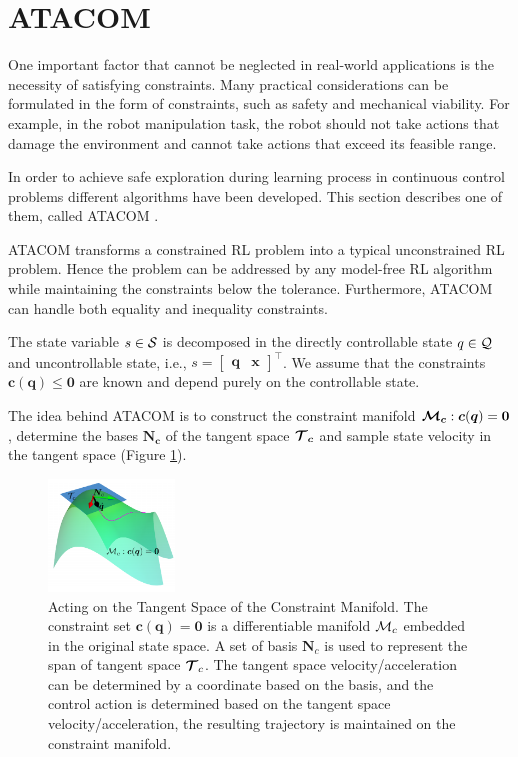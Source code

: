 \section{ATACOM}
One important factor that cannot be neglected in real-world applications is the necessity of satisfying constraints.
Many practical considerations can be formulated in the form of constraints, such as safety and mechanical viability. For example,
in the robot manipulation task, the robot should not take actions that damage the environment and cannot take actions that exceed
its feasible range.

In order to achieve safe exploration during learning process in continuous control problems different algorithms have been developed.
This section describes one of them, called ATACOM \cite{Atacom}.
 
ATACOM transforms a constrained RL problem into a typical unconstrained RL problem. Hence the problem can be addressed by any
model-free RL algorithm while maintaining the constraints below the tolerance. Furthermore, ATACOM can handle both equality and inequality
constraints.

The state variable $s \in \mathcal{S}$ is decomposed in the directly controllable state $q \in \mathcal{Q}$ and uncontrollable state, i.e., $s = \left[\begin{smallmatrix} \bm{q} & \bm{x}\end{smallmatrix}\right]^\intercal$.
We assume that the constraints $\bm{c}(\bm{q}) \le \bm{0}$ are known and depend purely on the controllable state. 

The idea behind ATACOM is to construct the constraint manifold $\bm{\mathcal{M}_c} : \bm{c}(\bm{q}) = \bm{0}$, determine the bases $\bm{N_c}$ of the tangent space $\bm{\mathcal{T}_c}$
and sample state velocity in the tangent space (Figure \ref{fig:constraint_manifold}).

\begin{figure}[H]
    \centering
    \includegraphics[width=0.3\textwidth]{Images/constraint_manifold.png}
    \caption[ATACOM]{
        Acting on the Tangent Space of the Constraint Manifold. The constraint set $\bm{c}(\bm{q}) = \bm{0}$ is a differentiable manifold
        $\mathcal{M}_c$ embedded in the original state space. A set of basis $\bm{N}_c$ is used to represent the span of tangent space $\bm{\mathcal{T}}_c$.
        The tangent space velocity/acceleration can be determined by a coordinate based on the basis, and the control action is determined based on the tangent
        space velocity/acceleration, the resulting trajectory is maintained on the constraint manifold.
        }
    \label{fig:constraint_manifold}
\end{figure}

